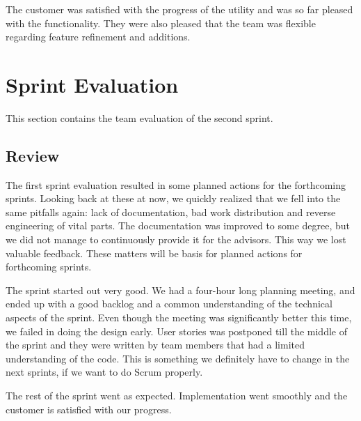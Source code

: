 The customer was satisfied with the progress of the \gls{utility} and was so
far pleased with the functionality. They were also pleased that the team was
flexible regarding feature refinement and additions.

\section{Sprint Evaluation}
\label{sec:sp2:eval}
This section contains the team evaluation of the second sprint.

\subsection{Review}
The first sprint evaluation resulted in some planned actions for the forthcoming sprints. Looking back at these at now, we quickly realized that we fell into the same pitfalls again: lack of documentation, bad work distribution and reverse engineering of vital parts. The documentation was improved to some degree, but we did not manage to continuously provide it for the advisors. This way we lost valuable feedback. These matters will be basis for planned actions for forthcoming sprints. 

The sprint started out very good. We had a four-hour long planning meeting, and ended up with a good backlog and a common understanding of the technical aspects of the sprint. Even though the meeting was significantly better this time, we failed in doing the design early. User stories was postponed till the middle of the sprint and they were written by team members that had a limited understanding of the code. This is something we definitely have to change in the next sprints, if we want to do Scrum properly.

The rest of the sprint went as expected. Implementation went smoothly and the customer is satisfied with our progress.


